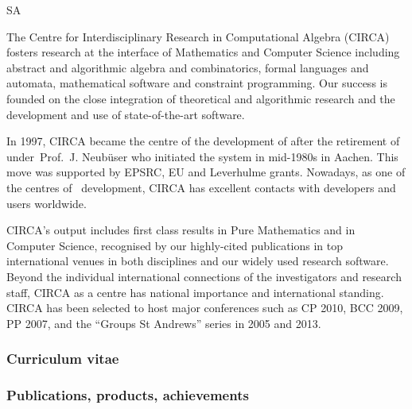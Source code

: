 \begin{sitedescription}{SA}

% 


The Centre for Interdisciplinary Research in Computational Algebra (CIRCA)
fosters research at the interface of Mathematics and Computer Science including
abstract and algorithmic algebra and combinatorics, formal languages and
automata, mathematical software and constraint programming. Our success is 
founded on the close integration of theoretical and algorithmic research and 
the development and use of state-of-the-art software.

In 1997, CIRCA became the centre of the development of \GAP after the 
retirement of under~Prof.~J. Neub\"user who initiated the system in 
mid-1980s in Aachen. This move was supported by EPSRC, EU and Leverhulme 
grants. Nowadays, as one of the centres of \GAP\ development, CIRCA has
excellent contacts with developers and users worldwide. 

CIRCA's output includes first class results in Pure Mathematics and in
Computer Science, recognised by our highly-cited publications in top
international venues in both disciplines and our widely used research
software. Beyond the individual international connections of the 
investigators and research staff, CIRCA as a centre has national 
importance and international standing. CIRCA has been selected to host 
major conferences such as CP 2010, BCC 2009, PP 2007, and the 
``Groups St Andrews'' series in 2005 and 2013.


\subsubsection*{Curriculum vitae}




%


\subsubsection*{Publications, products, achievements}


\end{sitedescription}

